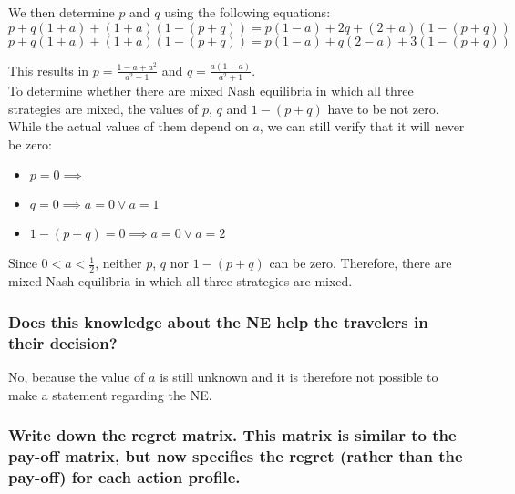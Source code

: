 \documentclass[11pt]{article}
\begin{document}
    We then determine $p$ and $q$ using the following equations:
    \begin{equation}
        p+q(1+a)+(1+a)(1-(p+q)) = p(1-a)+2q+(2+a)(1-(p+q))
    \end{equation}
    \begin{equation}
        p+q(1+a)+(1+a)(1-(p+q)) = p(1-a)+q(2-a)+3(1-(p+q))
    \end{equation}

    This results in $p=\frac{1-a+a^2}{a^2+1}$ and $q=\frac{a(1-a)}{a^2+1}$. \\

    To determine whether there are mixed Nash equilibria in which all three strategies are mixed, the values of $p$, $q$ and $1-(p+q)$ have to be not zero. While the actual values of them depend on $a$, we can still verify that it will never be zero:
    \begin{itemize}
        \item $p=0 \implies$ 
        \item $q=0 \implies a=0 \lor a=1$
        \item $1-(p+q)=0 \implies a=0 \lor a=2 $
    \end{itemize}

    Since $0<a<\frac{1}{2}$, neither $p$, $q$ nor $1-(p+q)$ can be zero. Therefore, there are mixed Nash equilibria in which all three strategies are mixed.

    \subsubsection{Does this knowledge about the NE help the travelers in their decision?}
    No, because the value of $a$ is still unknown and it is therefore not possible to make a statement regarding the NE.

    \subsubsection{Write down the regret matrix. This matrix is similar to the pay-off matrix, but now specifies the regret (rather than the pay-off) for each action profile.}
\end{document}
